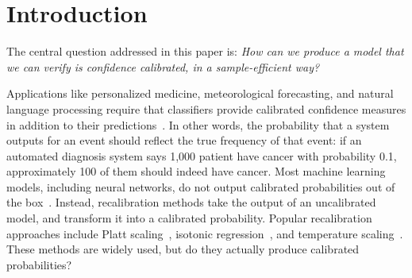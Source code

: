 \section{Introduction}

The central question addressed in this paper is: \emph{How can we produce a model that we can verify is confidence calibrated, in a sample-efficient way?}

Applications like personalized medicine, meteorological forecasting, and natural language processing require that classifiers provide calibrated confidence measures in addition to their predictions~\cite{jiang2012calibrating, brocker2009decomposition, nguyen2015posterior}.
In other words, the probability that a system outputs for an event should reflect the true frequency of that event: if an automated diagnosis system says 1,000 patient have cancer with probability 0.1, approximately 100 of them should indeed have cancer.
Most machine learning models, including neural networks, do not output calibrated probabilities out of the box~\cite{guo2017calibration, zadrozny2001calibrated}.
Instead, recalibration methods take the output of an uncalibrated model, and transform it into a calibrated probability.
Popular recalibration approaches include Platt scaling~\cite{platt1999probabilistic}, isotonic regression~\cite{zadrozny2002transforming}, and temperature scaling~\cite{guo2017calibration}. These methods are widely used, but do they actually produce calibrated probabilities?


